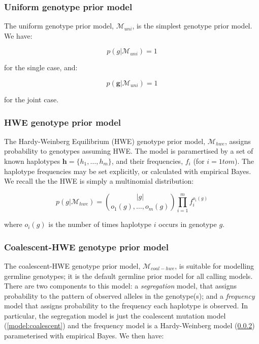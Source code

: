 \documentclass{article}
\begin{document}
\subsubsection{Uniform genotype prior model}\label{model:uniform}

The uniform genotype prior model, $\mathcal{M}_{uni}$, is the simplest genotype prior model. We have:

\begin{equation}
    p(g | \mathcal{M}_{uni}) = 1
\end{equation}

for the single case, and:

\begin{equation}
    p(\boldsymbol{g} | \mathcal{M}_{uni}) = 1
\end{equation}

for the joint case.

\subsubsection{HWE genotype prior model}\label{model:hwe}

The Hardy-Weinberg Equilibrium (HWE) genotype prior model, $\mathcal{M}_{hwe}$, assigns probability to genotypes assuming HWE. The model is paramertised by a set of known haplotypes $\boldsymbol{h} = \{h_1, \dots, h_m\}$, and their frequencies, $f_i$ (for $i = 1 to m$). The haplotype frequencies may be set explicitly, or calculated with empirical Bayes. We recall the the HWE is simply a multinomial distribution:

\begin{equation}
    p(g | \mathcal{M}_{hwe}) = \binom{|g|}{o_1(g), \dots, o_m(g)} \prod_{i=1}^m f_i^{o_i(g)}
\end{equation}

where $o_i(g)$ is the number of times haplotype $i$ occurs in genotype $g$.

\subsubsection{Coalescent-HWE genotype prior model}\label{model:coalescent-hwe}

The coalescent-HWE genotype prior model, $\mathcal{M}_{coal-hwe}$, is suitable for modelling germline genotypes; it is the default germline prior model for all calling models. There are two components to this model: a \emph{segregation} model, that assigns probability to the pattern of observed alleles in the genotype(s); and a \emph{frequency} model that assigns probability to the frequency each haplotype is observed. In particular, the segregation model is just the coalescent mutation model (\ref{model:coalescent}) and the frequency model is a Hardy-Weinberg model (\ref{model:hwe}) parameterised with empirical Bayes. We then have:
\end{document}
